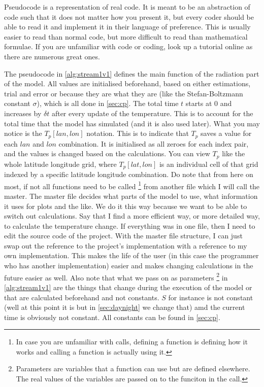 Pseudocode is a representation of real code. It is meant to be an abstraction of code such that it does not matter how you present it, but every coder should be able to read it and implement 
it in their language of preference. This is usually easier to read than normal code, but more difficult to read than mathematical formulae. If you are unfamiliar with code or coding, look up 
a tutorial online as there are numerous great ones.

The pseudocode in \autoref{alg:stream1v1} defines the main function of the radiation part of the model. All values are initialised beforehand, based on either estimations, trial and error or 
because they are what they are (like the Stefan-Boltzmann constant $\sigma$), which is all done in \autoref{sec:cp}. The total time $t$ starts at 0 and increases by $\delta t$ after every 
update of the temperature. This is to account for the total time that the model has simulated (and it is also used later). What you may notice is the $T_p[lan, lon]$ notation. This is to indicate 
that $T_p$ saves a value for each $lan$ and $lon$ combination. It is initialised as all zeroes for each index pair, and the values is changed based on the calculations. You can view $T_p$ like 
the whole latitude longitude grid, where $T_p[lat, lon]$ is an individual cell of that grid indexed by a specific latitude longitude combination. Do note that from here on most, if not all
functions need to be called \footnote{In case you are unfamiliar with calls, defining a function is defining how it works and calling a function is actually using it.} from another file which I 
will call the master. The master file decides what parts of the model to use, what information it uses for plots and the like. We do it this way because we want to be able to switch out 
calculations. Say that I find a more efficient way, or more detailed way, to calculate the temperature change. If everything was in one file, then I need to edit the source code of the project.
With the master file structure, I can just swap out the reference to the project's implementation with a reference to my own implementation. This makes the life of the user (in this case the 
programmer who has another implementation) easier and makes changing calculations in the future easier as well. Also note that what we pass on as parameters \footnote{Parameters are variables 
that a function can use but are defined elsewhere. The real values of the variables are passed on to the funciton in the call.} in \autoref{alg:stream1v1} are the 
things that change during the execution of the model or that are calculated beforehand and not constants. $S$ for instance is not constant (well at this point it is but in \autoref{sec:daynight} 
we change that) amd the current time is obviously not constant. All constants can be found in \autoref{sec:cp}.

